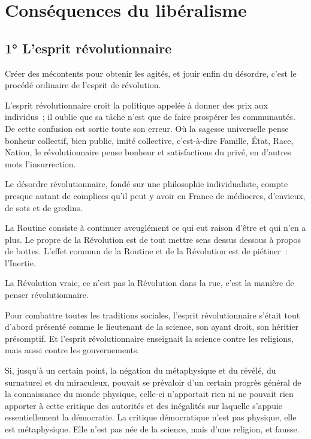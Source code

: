 \documentclass[french,twoside]{book} %
\newcommand{\astermono}{\medskip\centerline{\color{rubric}\large\selectfont{\syms ✻}}\medskip\par}%
\begin{document}
\section[Conséquences du libéralisme]{Conséquences du libéralisme}
\subsection[1° L’esprit révolutionnaire]{1° L’esprit révolutionnaire}
\noindent Créer des mécontents pour obtenir les agités, et jouir enfin du désordre, c’est le procédé ordinaire de l’esprit de révolution.\par
L’esprit révolutionnaire croit la politique appelée à donner des prix aux individus ; il oublie que sa tâche n’est que de faire prospérer les communautés. De cette confusion est sortie toute son erreur. Où la sagesse universelle pense bonheur collectif, bien public, imité collective, c’est-à-dire Famille, État, Race, Nation, le révolutionnaire pense bonheur et satisfactions du privé, en d’autres mots l’insurrection.\par

\astermono

\noindent Le désordre révolutionnaire, fondé sur une philosophie individualiste, compte presque autant de complices qu’il peut y avoir en France de médiocres, d’envieux, de sots et de gredins.\par

\astermono

\noindent La Routine consiste à continuer aveuglément ce qui eut raison d’être et qui n’en a plus. Le propre de la Révolution est de tout mettre sens dessus dessous à propos de bottes. L’effet commun de la Routine et de la Révolution est de piétiner : l’Inertie.\par

\astermono

\noindent La Révolution vraie, ce n’est pas la Révolution dans la rue, c’est la manière de penser révolutionnaire.\par

\astermono

\noindent Pour combattre toutes les traditions sociales, l’esprit révolutionnaire s’était tout d’abord présenté comme le lieutenant de la science, son ayant droit, son héritier présomptif. Et l’esprit révolutionnaire enseignait la science contre les religions, mais aussi contre les gouvernements.\par
Si, jusqu’à un certain point, la négation du métaphysique et du révélé, du surnaturel et du miraculeux, pouvait se prévaloir d’un certain progrès général de la connaissance du monde physique, celle-ci n’apportait rien ni ne pouvait rien apporter à cette critique des autorités et des inégalités sur laquelle s’appuie essentiellement la démocratie. La critique démocratique n’est pas physique, elle est métaphysique. Elle n’est pas née de la science, mais d’une religion, et fausse.
\end{document}
